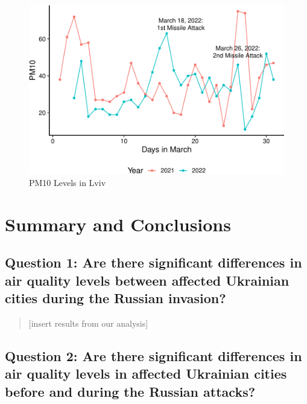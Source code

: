 \documentclass[
  12pt,
]{article}
\begin{document}
\begin{figure}
\centering
\includegraphics{Fontanie_Gordon_Weinberg_Project_files/figure-latex/visualizing PM10 in Lviv-1.pdf}
\caption{PM10 Levels in Lviv}
\end{figure}

\newpage

\hypertarget{summary-and-conclusions}{%
\section{Summary and Conclusions}\label{summary-and-conclusions}}

\hypertarget{question-1-are-there-significant-differences-in-air-quality-levels-between-affected-ukrainian-cities-during-the-russian-invasion-1}{%
\subsection{Question 1: Are there significant differences in air quality
levels between affected Ukrainian cities during the Russian
invasion?}\label{question-1-are-there-significant-differences-in-air-quality-levels-between-affected-ukrainian-cities-during-the-russian-invasion-1}}

\begin{quote}
{[}insert results from our analysis{]}
\end{quote}

\hypertarget{question-2-are-there-significant-differences-in-air-quality-levels-in-affected-ukrainian-cities-before-and-during-the-russian-attacks-1}{%
\subsection{Question 2: Are there significant differences in air quality
levels in affected Ukrainian cities before and during the Russian
attacks?}\label{question-2-are-there-significant-differences-in-air-quality-levels-in-affected-ukrainian-cities-before-and-during-the-russian-attacks-1}}
\end{document}
